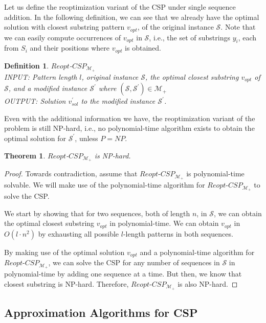 \documentclass[journal]{acm_proc_article-sp}
\newtheorem{theorem}{Theorem}
\newtheorem{definition}{Definition}
\begin{document}
Let us define the reoptimization variant of the CSP under single sequence addition. In the following definition, we can see that we already have the optimal solution with closest substring pattern $v_{opt}$, of the original instance $\mathcal{S}$. Note that we can easily compute occurrences of $v_{opt}$ in $\mathcal{S}$, i.e., the set of substrings $y_i$, each from $S_i$ and their positions where $v_{opt}$ is obtained.
\begin{definition}{$Reopt$-$CSP_{\mathcal{M}_+}$} \ \\ INPUT: Pattern length $l$, original instance $\mathcal{S}$, the optimal closest substring $v_{opt}$ of $\mathcal{S}$, and a modified instance $\mathcal{S}^\prime$ where $(\mathcal{S}, \mathcal{S}^\prime) \in  \mathcal{M}_+$\\
\noindent OUTPUT: Solution $v^\prime_{sol}$ to the modified instance $\mathcal{S}^\prime$.
\end{definition}
Even with the additional information we have, the reoptimization variant of the problem is still NP-hard, i.e., no polynomial-time algorithm exists to obtain the optimal solution for $\mathcal{S}^\prime$, unless $P=NP$. 
\begin{theorem} 
$Reopt$-$CSP_{\mathcal{M}_+}$ is NP-hard.
\label{thm:hard}
\end{theorem}
\begin{proof}
Towards contradiction, assume that $Reopt$-$CSP_{\mathcal{M}_+}$ is polynomial-time solvable. We will make use of the polynomial-time algorithm for $Reopt$-$CSP_{\mathcal{M}_+}$ to solve the CSP. 

We start by showing that for two sequences, both of length $n$, in $\mathcal{S}$, we can obtain the optimal closest substring $v_{opt}$ in polynomial-time. We can obtain $v_{opt}$ in $O(l \cdot n^2)$ by exhausting all possible $l$-length patterns in both sequences.

By making use of the optimal solution $v_{opt}$ and a polynomial-time algorithm for $Reopt$-$CSP_{\mathcal{M}_+}$, we can solve the CSP for any number of sequences in $\mathcal{S}$ in polynomial-time by adding one sequence at a time. But then, we know that closest substring is NP-hard. Therefore, $Reopt$-$CSP_{\mathcal{M}_+}$ is also NP-hard.

\end{proof}

\subsection{Approximation Algorithms for CSP}
\end{document}
